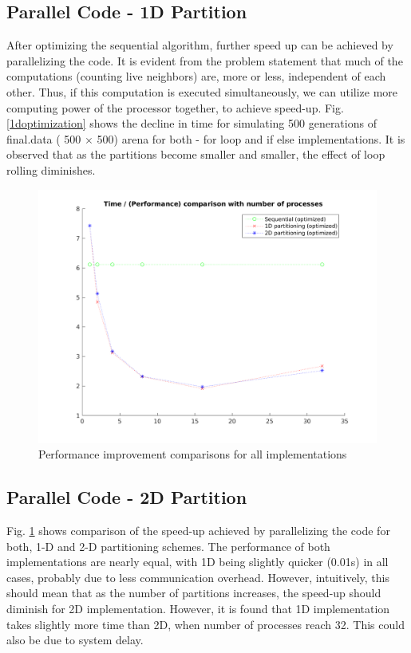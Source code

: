 \documentclass[a4paper, 10pt, conference]{IEEEtran}      %
\begin{document}
	\subsection{Parallel Code - 1D Partition}
	After optimizing the sequential algorithm, further speed up can be achieved by parallelizing the code. It is evident from the problem statement that much of the computations (counting live neighbors) are, more or less, independent of each other. Thus, if this computation is executed simultaneously, we can utilize more computing power of the processor together, to achieve speed-up. Fig.\ref{1doptimization} shows the decline in time for simulating 500 generations of final.data ( 500 $\times$ 500) arena for both - for loop and if else implementations. It is observed that as the partitions become smaller and smaller, the effect of loop rolling diminishes.
	\begin{figure}[h]
		\centering
		\includegraphics[width = 0.9\linewidth]{all_algo_performance}
		\caption{Performance improvement comparisons for all implementations}
		\label{speedupall}
	\end{figure}
	
	\subsection{Parallel Code - 2D Partition}
	Fig. \ref{speedupall} shows comparison of the speed-up achieved by parallelizing the code for both, 1-D and 2-D partitioning schemes. The performance of both implementations are nearly equal, with 1D being slightly quicker (0.01s) in all cases, probably due to less communication overhead. However, intuitively, this should mean that as the number of partitions increases, the speed-up should diminish for 2D implementation. However, it is found that 1D implementation takes slightly more time than 2D, when number of processes reach 32. This could also be due to system delay.
\end{document}
